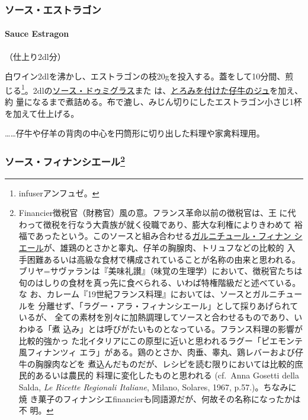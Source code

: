 \begin{recette}
{\subsubsection{ソース・エストラゴン}\label{ux30bdux30fcux30b9ux30a8ux30b9ux30c8ux30e9ux30b4ux30f3}}

\hypertarget{sauce-estragon}{%
\paragraph{Sauce Estragon}\label{sauce-estragon}}

   

（仕上り2\undemi{}dl分）

白ワイン2dlを沸かし、エストラゴンの枝20gを投入する。蓋をして10分間、煎
じる\footnote{infuserアンフュゼ。}。2\undemi{}dlの\protect\hyperlink{sauce-demi-glace}{ソース・ドゥミグラス}また
は、\protect\hyperlink{jus-de-veau-lie}{とろみを付けた仔牛のジュ}を加え、約\deuxtiers{}
量になるまで煮詰める。布で漉し、みじん切りにしたエストラゴン小さじ1杯
を加えて仕上げる。

\ldots{}\ldots{}仔牛や仔羊の背肉の中心を円筒形に切り出した料理や家禽料理用。

\maeaki

\hypertarget{ux30bdux30fcux30b9ux30d5ux30a3ux30caux30f3ux30b7ux30a8ux30fcux30eb34}{%
\subsubsection[ソース・フィナンシエール]{\texorpdfstring{ソース・フィナンシエール\footnote{Financier徴税官（財務官）風の意。フランス革命以前の徴税官は、王
  に代わって徴税を行なう大貴族が就く役職であり、膨大な利権によりきわめて
  裕福であったという。このソースと組み合わせる\href{}{ガルニチュール・フィナン
  シエール}が、雄鶏のとさかと睾丸、仔羊の胸腺肉、トリュフなどの比較的
  入手困難あるいは高級な食材で構成されていることが名称の由来と思われる。
  ブリヤ=サヴァランは『美味礼讃』（味覚の生理学）において、徴税官たちは
  旬のはしりの食材を真っ先に食べられる、いわば特権階級だと述べている。な
  お、カレーム『19世紀フランス料理』においては、ソースとガルニチュールを
  分離せず、「ラグー・アラ・フィナンシエール」として採りあげられているが、
  全ての素材を別々に加熱調理してソースと合わせるものであり、いわゆる「煮
  込み」とは呼びがたいものとなっている。フランス料理の影響が比較的強かっ
  た北イタリアにこの原型に近いと思われるラグー「ピエモンテ風フィナンツィ
  エラ」がある。鶏のとさか、肉垂、睾丸、鶏レバーおよび仔牛の胸腺肉などを
  煮込んだものだが、レシピを読む限りにおいては比較的庶民的あるいは農民的
  料理に変化したものと思われる (cf.~Anna Gosetti della Salda, \emph{Le
  Ricette Regionali Italiane}, Milano, Solares, 1967, p.57.)。ちなみに焼
  き菓子のフィナンシエfinancierも同語源だが、何故その名称になったかは不
  明。}}{ソース・フィナンシエール}}\label{ux30bdux30fcux30b9ux30d5ux30a3ux30caux30f3ux30b7ux30a8ux30fcux30eb34}}


\end{recette}
